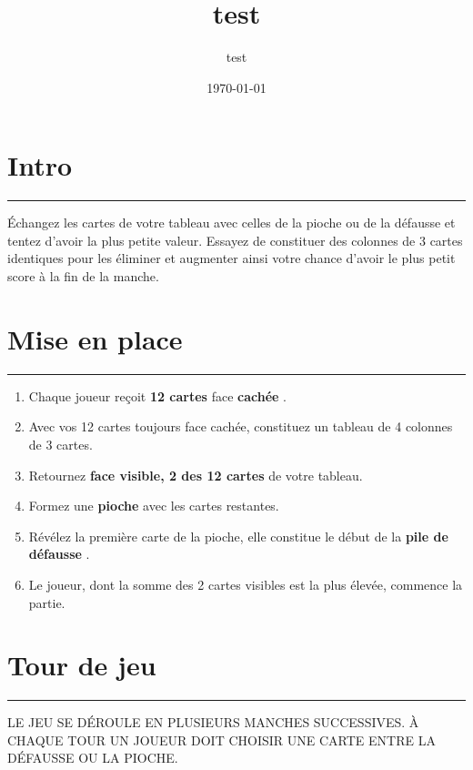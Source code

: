\documentclass{article}%
\title{test}%
\author{test}%
\date{\today}%
\begin{document}
%
\normalsize%
\maketitle\thispagestyle{header}%
\pagestyle{header}%
\sectionfont{\color{blue}}%
\subsectionfont{\color{blue}}%
\subsubsectionfont{\color{blue}}%
\section{ Intro
}%
\label{sec:Intro}%
\textcolor{blue}{\rule{18cm}{0.07cm}}\break%
Échangez les cartes de votre tableau avec celles de la pioche ou de la défausse et tentez d'avoir la plus petite valeur. Essayez de constituer des colonnes de 3 cartes identiques pour les éliminer et augmenter ainsi votre chance d'avoir le plus petit score à la fin de la manche.


%
\sectionfont{\color{mygreen}}%
\subsectionfont{\color{mygreen}}%
\subsubsectionfont{\color{mygreen}}%
\section{ Mise en place
}%
\label{sec:Miseenplace}%
\textcolor{mygreen}{\rule{18cm}{0.07cm}}\break%
\begin{enumerate}%
\item%
%
 Chaque joueur reçoit %
\textcolor{mygreen}{%
\textbf{12 cartes}%
}%
\textit{ }%
 face %
\textcolor{mygreen}{%
\textbf{cachée}%
}%
.
%
\item%
%
 Avec vos 12 cartes toujours face cachée, constituez un tableau de 4 colonnes de 3 cartes.
%
\item%
%
 Retournez %
\textcolor{mygreen}{%
\textbf{face visible, 2 des 12 cartes}%
}%
\textit{ }%
 de votre tableau.
%
\item%
%
 Formez une %
\textcolor{mygreen}{%
\textbf{pioche}%
}%
\textit{ }%
 avec les cartes restantes.
%
\item%
%
 Révélez la première carte de la pioche, elle constitue le début de la %
\textcolor{mygreen}{%
\textbf{pile de défausse}%
}%
.
%
\item%
%
 Le joueur, dont la somme des 2 cartes visibles est la plus élevée, commence la partie.
%
\end{enumerate}

%
\sectionfont{\color{red}}%
\subsectionfont{\color{red}}%
\subsubsectionfont{\color{red}}%
\section{ Tour de jeu
}%
\label{sec:Tourdejeu}%
\textcolor{red}{\rule{18cm}{0.07cm}}\break%
LE JEU SE DÉROULE EN PLUSIEURS MANCHES SUCCESSIVES. À CHAQUE TOUR UN JOUEUR DOIT CHOISIR UNE CARTE ENTRE LA DÉFAUSSE OU LA PIOCHE.
\end{document}
